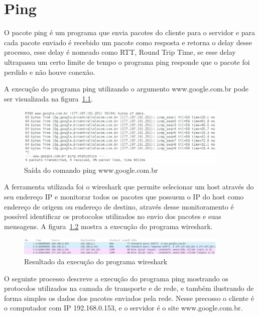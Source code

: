\chapter{Ping}

O pacote ping é um programa que envia pacotes do cliente para o servidor e para
cada pacote enviado é recebido um pacote como resposta e retorna o delay desse
processo, esse delay é nomeado como RTT, Round Trip Time, se esse delay
ultrapassa um certo limite de tempo o programa ping responde que o pacote foi
perdido e não houve conexão.

A execução do programa ping utilizando o argumento www.google.com.br pode ser
visualizada na figura~\ref{fig:ping_result}.

\begin{figure}[h]
  \centering
  \includegraphics[width=0.9\textwidth]{figuras/ping_result.eps}
  \caption{Saída do comando ping www.google.com.br}
  \label{fig:ping_result}
\end{figure}

A ferramenta utilizada foi o wireshark que permite selecionar um host através
do seu endereço IP e monitorar todos os pacotes que possuem o IP do host como
endereço de origem ou endereço de destino, através desse monitoramento é
possível identificar os protocolos utilizados no envio dos pacotes e suas
mensagens. A figura~\ref{fig:wireshark_result} mostra a execução do programa
wireshark.

\begin{figure}[h]
  \centering
  \includegraphics[width=0.9\textwidth]{figuras/wireshark.eps}
  \caption{Resultado da execução do programa wireshark}
  \label{fig:wireshark_result}
\end{figure}

O seguinte processo descreve a execução do programa ping mostrando os
protocolos utilizados na camada de transporte e de rede, e também
ilustrando de forma simples os dados dos pacotes enviados pela rede.
Nesse precosso o cliente é o computador com IP 192.168.0.153, e o
servidor é o site www.google.com.br.

